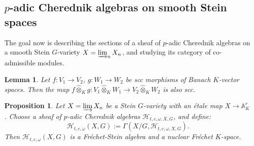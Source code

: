 \documentclass{amsart}
\newtheorem{prop}[defi]{ Proposition}
\newtheorem{Lemma}[defi]{Lemma}
\begin{document}
\subsection{\texorpdfstring{$p$-adic Cherednik algebras on smooth Stein spaces}{}}\label{Section p-adic cher alg smooth stein}
The goal now is describing the sections of a sheaf of $p$-adic Cherednik algebras on a smooth Stein $G$-variety $X=\varinjlim_nX_n$, and studying its category of co-admissible modules.
\begin{Lemma}\label{Lemma nuclear sections on Frechet spaces}
Let $f:V_1\rightarrow V_2$, $g:W_1\rightarrow W_2$ be \emph{scc} morphisms of Banach $K$-vector spaces. Then the map $f\widehat{\otimes}_Kg:V_1\widehat{\otimes}_K W_1\rightarrow V_2\widehat{\otimes}_K W_2$ is also \emph{scc}.
\end{Lemma}
\begin{prop}\label{prop sections on Stein spaces}
Let $X=\varinjlim X_n$ be a Stein $G$-variety with an étale map $X\rightarrow \mathbb{A}^r_K$. Choose a sheaf of $p$-adic Cherednik algebras $\mathcal{H}_{t,c,\omega,X,G}$, and define: 
\begin{equation*}
    \mathcal{H}_{t,c,\omega}(X,G):=\Gamma(X/G,\mathcal{H}_{t,c,\omega,X,G}).
\end{equation*}
Then  $\mathcal{H}_{t,c,\omega}(X,G)$ is a Fréchet-Stein algebra and a nuclear Fréchet $K$-space.
\end{prop}
\end{document}
